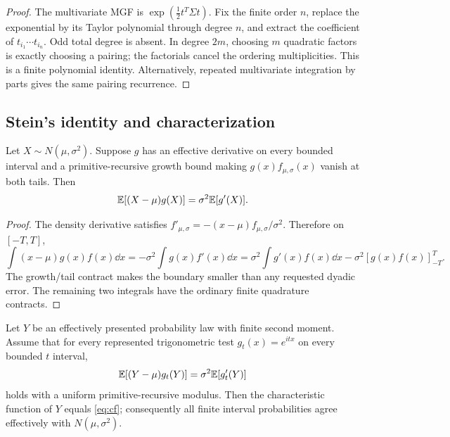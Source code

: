 \begin{proof}
The multivariate MGF is $\exp(\tfrac12 t^T\Sigma t)$.  Fix the finite order $n$, replace the exponential by its Taylor polynomial through degree $n$, and extract the coefficient of $t_{i_1}\cdots t_{i_n}$.  Odd total degree is absent.  In degree $2m$, choosing $m$ quadratic factors is exactly choosing a pairing; the factorials cancel the ordering multiplicities.  This is a finite polynomial identity.  Alternatively, repeated multivariate integration by parts gives the same pairing recurrence.
\end{proof}

\subsection{Stein's identity and characterization}

\begin{theorem}\label{thm:stein}
Let $X\sim N(\mu,\sigma^2)$.  Suppose $g$ has an effective derivative on every bounded interval and a primitive-recursive growth bound making $g(x)f_{\mu,\sigma}(x)$ vanish at both tails.  Then
\begin{equation}\label{eq:stein}
 \mathbb E[(X-\mu)g(X)]=\sigma^2\mathbb E[g'(X)].
\end{equation}
\end{theorem}

\begin{proof}
The density derivative satisfies
$f'_{\mu,\sigma}=-(x-\mu)f_{\mu,\sigma}/\sigma^2$.  Therefore on $[-T,T]$,
\[
 \int (x-\mu)g(x)f(x)\dd x
 =-\sigma^2\int g(x)f'(x)\dd x
 =\sigma^2\int g'(x)f(x)\dd x
   -\sigma^2[g(x)f(x)]_{-T}^T.
\]
The growth/tail contract makes the boundary smaller than any requested dyadic error.  The remaining two integrals have the ordinary finite quadrature contracts.
\end{proof}

\begin{theorem}\label{thm:stein-characterization}
Let $Y$ be an effectively presented probability law with finite second moment.  Assume that for every represented trigonometric test $g_t(x)=e^{itx}$ on every bounded $t$ interval,
\begin{equation}\label{eq:stein-assumption}
 \mathbb E[(Y-\mu)g_t(Y)]=\sigma^2\mathbb E[g_t'(Y)]
\end{equation}
holds with a uniform primitive-recursive modulus.  Then the characteristic function of $Y$ equals \eqref{eq:cf}; consequently all finite interval probabilities agree effectively with $N(\mu,\sigma^2)$.
\end{theorem}


